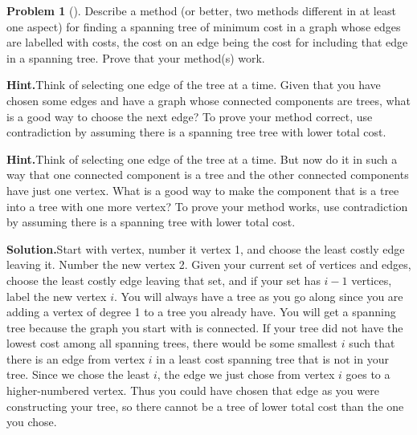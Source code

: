 \documentclass[10pt,]{book}
\theoremstyle{plain}
\theoremstyle{definition}
\newtheorem{activity}[project]{Problem}
\theoremstyle{definition}
\numberwithin{equation}{chapter}
\begin{document}
\begin{activity}[]\label{mincostspantree}
Describe a method (or better, two methods different in at least one aspect) for finding a spanning tree of minimum cost in a graph whose edges are labelled with costs, the cost on an edge being the cost for including that edge in a spanning tree. Prove that your method(s) work.%
\par\medskip\noindent%
\textbf{Hint.}\quad Think of selecting one edge of the tree at a time. Given that you have chosen some edges and have a graph whose connected components are trees, what is a good way to choose the next edge? To prove your method correct, use contradiction by assuming there is a spanning tree tree with lower total cost.%
\par\medskip\noindent%
\textbf{Hint.}\quad Think of selecting one edge of the tree at a time. But now do it in such a way that one connected component is a tree and the other connected components have just one vertex. What is a good way to make the component that is a tree into a tree with one more vertex? To prove your method works, use contradiction by assuming there is a spanning tree with lower total cost.%
\par\medskip\noindent%
\textbf{Solution.}\quad Start with vertex, number it vertex 1, and choose the least costly edge leaving it. Number the new vertex 2. Given your current set of vertices and edges, choose the least costly edge leaving that set, and if your set has \(i-1\) vertices, label the new vertex \(i\). You will always have a tree as you go along since you are adding a vertex of degree 1 to a tree you already have. You will get a spanning tree because the graph you start with is connected. If your tree did not have the lowest cost among all spanning trees, there would be some smallest \(i\) such that there is an edge from vertex \(i\) in a least cost spanning tree that is not in your tree. Since we chose the least \(i\), the edge we just chose from vertex \(i\) goes to a higher-numbered vertex. Thus you could have chosen that edge as you were constructing your tree, so there cannot be a tree of lower total cost than the one you chose.%
\par

\end{activity}
\end{document}
